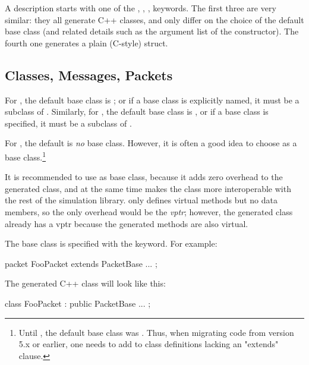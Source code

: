 A description starts with one of the , ,
,  keywords. The first three are very
similar: they all generate C++ classes, and only differ on the choice of the
default base class (and related details such as the argument list of the
constructor). The fourth one generates a plain (C-style) struct.


\subsection{Classes, Messages, Packets}
\label{sec:msg-defs:classes-messages-packets}
\label{sec:msg-defs:defining-classes}
\label{sec:msg-defs:messages-and-packets}
\label{sec:msg-defs:defining-messages-and-packets}

For , the default base class is ; or if a base
class is explicitly named, it must be a subclass of . Similarly,
for , the default base class is , or if a
base class is specified, it must be a subclass of .

For , the default is \textit{no} base class. However, it is often a
good idea to choose  as a base class.\footnote{Until , the default base class was . Thus, when migrating code from
version 5.x or earlier, one needs to add  to class
definitions lacking an "extends" clause.}

\begin{note}
  It is recommended to use  as base class, because it adds zero
  overhead to the generated class, and at the same time makes the class more
  interoperable with the rest of the simulation library. 
  only defines virtual methods but no data members, so the only overhead would
  be the \textit{vptr}; however, the generated class already has a vptr because
  the generated methods are also virtual.
\end{note}

The base class is specified with the  keyword. For example:

\begin{msg}
packet FooPacket extends PacketBase
{
    ...
};
\end{msg}

The generated C++ class will look like this:

\begin{cpp}
class FooPacket : public PacketBase {
    ...
};
\end{cpp}


